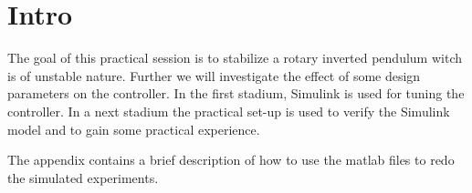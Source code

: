 \section{Intro}
The goal of this practical session is to stabilize a rotary inverted pendulum witch is of unstable nature. Further we will investigate the effect of some design parameters on the controller. In the first stadium, Simulink is used for tuning the controller. In a next stadium the practical set-up is used to verify the Simulink model and to gain some practical experience.

The appendix contains a brief description of how to use the matlab files to redo the simulated experiments.